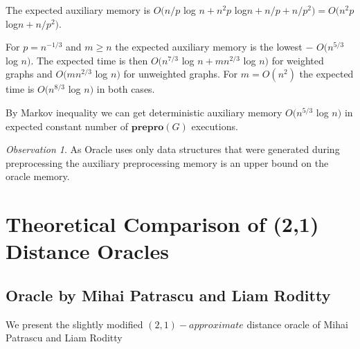 \documentclass[shortabstract, lic, english]{iithesis}
\theoremstyle{definition} \newtheorem{definition}{Definition}[chapter]
\theoremstyle{remark} \newtheorem{remark}[definition]{Observation}
\theoremstyle{plain} \newtheorem{theorem}[definition]{Theorem}
\theoremstyle{plain} \newtheorem{lemma}[definition]{Lemma}
\theoremstyle{plain} \newtheorem{conjecture}[definition]{Conjecture}
\DeclarePairedDelimiter{\ceil}{\lceil}{\rceil}
\begin{document}
The expected auxiliary memory is $O(n/p $ log $ n + n^2p$ log$ n + n/p + n/p^2) = O(n^2p$ log$ n + n/p^2)$.

For $p = n^{-1/3}$ and $m \geq n$ the expected auxiliary memory is the lowest $-$ $O(n^{5/3} $ log $ n)$.
The expected time is then $O(n^{7/3} $ log $ n + mn^{2/3}$ log $ n)$ for weighted graphs and
$O(mn^{2/3}$ log $ n)$ for unweighted graphs. For $m = O(n^2)$ the expected time is $O(n^{8/3} $ log $n)$ in both cases.

By Markov inequality we can get deterministic auxiliary memory $O(n^{5/3} $ log $ n)$ in expected constant number of $\mathbf{prepro}(G)$ executions.

\begin{remark}
As Oracle uses only data structures that were generated during preprocessing the auxiliary preprocessing memory is an upper bound on the oracle memory.
\end{remark}






\chapter{Theoretical Comparison of (2,1) Distance Oracles} \label{21TheoreticalComparison}

\section{Oracle by Mihai Patrascu and Liam Roditty} \label{21OraclePatRod}

We present the slightly modified $(2,1)-approximate$ distance oracle of Mihai Patrascu and Liam Roditty \cite{21OracleLessMemory}

\noindent{}
\end{document}
